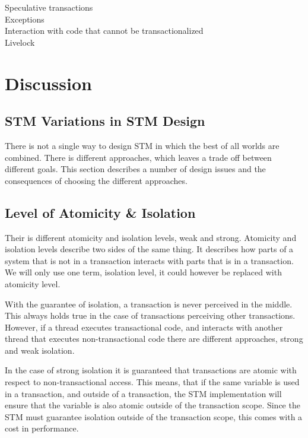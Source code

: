 Speculative transactions\\
Exceptions\\
Interaction with code that cannot be transactionalized\\
Livelock\\
\section{Discussion}
\label{sec:stm_discussion}
\subsection{\ac{STM} Variations in \ac{STM} Design}
There is not a single way to design \ac{STM} in which the best of all worlds are combined. There is different approaches, which leaves a trade off between different goals. This section describes a number of design issues and the consequences of choosing the different approaches.

\subsection{Level of Atomicity \& Isolation}
\label{subsec:isolation_level}
Their is different atomicity and isolation levels, weak and strong. Atomicity and isolation levels describe two sides of the same thing. It describes how parts of a system that is not in a transaction interacts with parts that is in a transaction. We will only use one term, isolation level, it could however be replaced with atomicity level.

With the guarantee of isolation, a transaction is never perceived in the middle. This always holds true in the case of transactions perceiving other transactions. However, if a thread executes transactional code, and interacts with another thread that executes non-transactional code there are different approaches, strong and weak isolation.

In the case of strong isolation it is guaranteed that transactions are atomic with respect to non-transactional access\cite[p. 2083]{herlihy2011tm}. This means, that if the same variable is used in a transaction, and outside of a transaction, the \ac{STM} implementation will ensure that the variable is also atomic outside of the transaction scope. Since the \ac{STM} must guarantee isolation outside of the transaction scope, this comes with a cost in performance\cite{herlihy2011tm}. 

